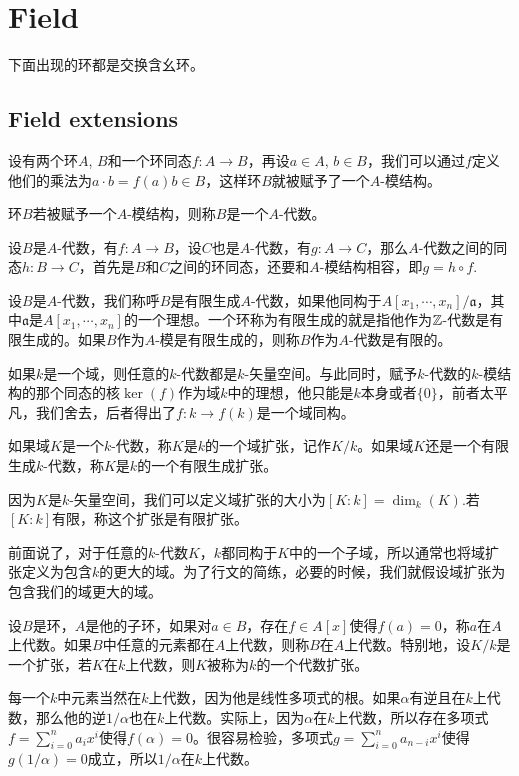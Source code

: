 \chapter{Field}
下面出现的环都是交换含幺环。
\section{Field extensions}

设有两个环$A$, $B$和一个环同态$f:A\to B$，再设$a\in A$, $b\in B$，我们可以通过$f$定义他们的乘法为$a\cdot b=f(a)b\in B$，这样环$B$就被赋予了一个$A$-模结构。

\para 环$B$若被赋予一个$A$-模结构，则称$B$是一个$A$-代数。

设$B$是$A$-代数，有$f:A\to B$，设$C$也是$A$-代数，有$g:A\to C$，那么$A$-代数之间的同态$h:B\to C$，首先是$B$和$C$之间的环同态，还要和$A$-模结构相容，即$g=h\circ f$.

\para 设$B$是$A$-代数，我们称呼$B$是有限生成$A$-代数，如果他同构于$A[x_1,\cdots ,x_n]/\mathfrak{a}$，其中$\mathfrak{a}$是$A[x_1,\cdots ,x_n]$的一个理想。一个环称为有限生成的就是指他作为$\mathbb{Z}$-代数是有限生成的。如果$B$作为$A$-模是有限生成的，则称$B$作为$A$-代数是有限的。

如果$k$是一个域，则任意的$k$-代数都是$k$-矢量空间。与此同时，赋予$k$-代数的$k$-模结构的那个同态的核$\ker(f)$作为域$k$中的理想，他只能是$k$本身或者$\{0\}$，前者太平凡，我们舍去，后者得出了$f:k\to f(k)$是一个域同构。

\para 如果域$K$是一个$k$-代数，称$K$是$k$的一个域扩张，记作$K/k$。如果域$K$还是一个有限生成$k$-代数，称$K$是$k$的一个有限生成扩张。

因为$K$是$k$-矢量空间，我们可以定义域扩张的大小为$[K:k]=\dim_k(K)$.若$[K:k]$有限，称这个扩张是有限扩张。

前面说了，对于任意的$k$-代数$K$，$k$都同构于$K$中的一个子域，所以通常也将域扩张定义为包含$k$的更大的域。为了行文的简练，必要的时候，我们就假设域扩张为包含我们的域更大的域。

\para 设$B$是环，$A$是他的子环，如果对$a\in B$，存在$f\in A[x]$使得$f(a)=0$，称$a$在$A$上代数。如果$B$中任意的元素都在$A$上代数，则称$B$在$A$上代数。特别地，设$K/k$是一个扩张，若$K$在$k$上代数，则$K$被称为$k$的一个代数扩张。

每一个$k$中元素当然在$k$上代数，因为他是线性多项式的根。如果$\alpha$有逆且在$k$上代数，那么他的逆$1/\alpha$也在$k$上代数。实际上，因为$\alpha$在$k$上代数，所以存在多项式$f=\sum_{i=0}^na_ix^i$使得$f(\alpha)=0$。很容易检验，多项式$g=\sum_{i=0}^na_{n-i}x^i$使得$g(1/\alpha)=0$成立，所以$1/\alpha$在$k$上代数。

